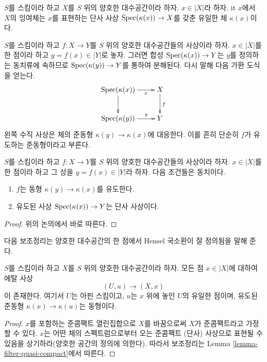 \begin{definition}
\label{definition-residue-field}
$S$를 스킴이라 하고 $X$를 $S$ 위의 양호한 대수공간이라 하자.
$x \in |X|$라 하자. {it $x$에서 $X$의 잉여체}는 $x$를 표현하는
단사 사상 $\mathop{\mathrm{Spec}}(\kappa(x)) \to X$를 갖춘 유일한 체 $\kappa(x)$이다.
\end{definition}

\noindent
$S$를 스킴이라 하고 $f : X \to Y$를 $S$ 위의 양호한 대수공간들의
사상이라 하자. $x \in |X|$를 한 점이라 하고 $y = f(x) \in |Y|$로
놓자. 그러면 합성 $\mathop{\mathrm{Spec}}(\kappa(x)) \to Y$는 $y$를 정의하는 동치류에
속하므로 $\mathop{\mathrm{Spec}}(\kappa(y)) \to Y$를 통하여 분해된다. 다시 말해 다음
가환 도식을 얻는다.
$$
\xymatrix{
\Spec(\kappa(x)) \ar[r]_-x \ar[d] & X \ar[d]^f \\
\Spec(\kappa(y)) \ar[r]^-y & Y
}
$$
왼쪽 수직 사상은 체의 준동형 $\kappa(y) \to \kappa(x)$에 대응한다.
이를 흔히 단순히 $f$가 유도하는 준동형이라고 부른다.

\begin{lemma}
\label{lemma-identifies-residue-fields}
$S$를 스킴이라 하고 $f : X \to Y$를 $S$ 위의 양호한 대수공간들의
사상이라 하자. $x \in |X|$를 한 점이라 하고 그 상을
$y = f(x) \in |Y|$라 하자. 다음 조건들은 동치이다.
\begin{enumerate}
\item $f$는 동형 $\kappa(y) \to \kappa(x)$를 유도한다.
\item 유도된 사상 $\mathop{\mathrm{Spec}}(\kappa(x)) \to Y$는 단사 사상이다.
\end{enumerate}
\end{lemma}

\begin{proof}
위의 논의에서 바로 따른다.
\end{proof}

\noindent
다음 보조정리는 양호한 대수공간의 한 점에서 Hensel 국소환이 잘
정의됨을 말해 준다.

\begin{lemma}
\label{lemma-decent-space-elementary-etale-neighbourhood}
$S$를 스킴이라 하고 $X$를 $S$ 위의 양호한 대수공간이라 하자.
모든 점 $x \in |X|$에 대하여 에탈 사상
$$
(U, u) \longrightarrow (X, x)
$$
이 존재한다. 여기서 $U$는 아핀 스킴이고, $u$는 $x$ 위에 놓인
$U$의 유일한 점이며, 유도된 준동형 $\kappa(x) \to \kappa(u)$는
동형이다.
\end{lemma}

\begin{proof}
$x$를 포함하는 준콤팩트 열린집합으로 $X$를 바꿈으로써 $X$가
준콤팩트라고 가정할 수 있다. $x$는 어떤 체의 스펙트럼으로부터 오는
준콤팩트 (단사) 사상으로 표현될 수 있음을 상기하라(양호한 공간의
정의에 의한다).
따라서 보조정리는 Lemma \ref{lemma-filter-quasi-compact}에서 따른다.
\end{proof}

